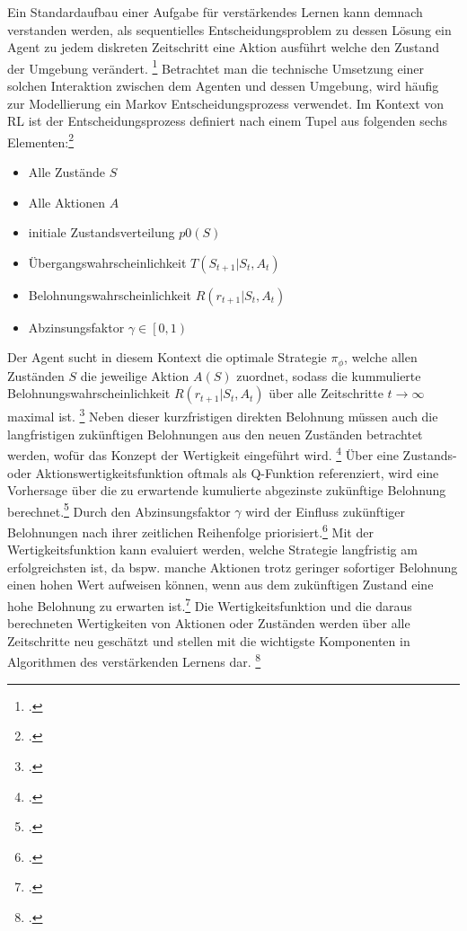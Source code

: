 Ein Standardaufbau einer Aufgabe für verstärkendes Lernen kann demnach verstanden werden, als sequentielles Entscheidungsproblem zu dessen Lösung ein Agent zu jedem diskreten Zeitschritt eine Aktion ausführt welche den Zustand der Umgebung verändert. \footcite[Vgl.][S. 2]{Zhao.2020}
Betrachtet man die technische Umsetzung einer solchen Interaktion zwischen dem Agenten und dessen Umgebung, wird häufig zur Modellierung ein Markov Entscheidungsprozess verwendet.
Im Kontext von RL ist der Entscheidungsprozess definiert nach einem Tupel aus folgenden sechs Elementen:\footcite[Vgl.][S. 2]{Zhang.2018}
\begin{itemize}
    \item Alle Zustände $S$
    \item Alle Aktionen $A$
    \item initiale Zustandsverteilung $p0(S)$
    \item Übergangswahrscheinlichkeit $T(S_{t+1}|S_{t},A_{t})$
    \item Belohnungswahrscheinlichkeit $R(r_{t+1}|S_{t},A_{t})$
    \item Abzinsungsfaktor $\gamma \in \left[0,1\right)$
\end{itemize}
Der Agent sucht in diesem Kontext die optimale Strategie $\pi_{\phi}$, welche allen Zuständen $S$ die jeweilige Aktion $A(S)$ zuordnet, sodass die kummulierte Belohnungswahrscheinlichkeit $R(r_{t+1}|S_{t},A_{t})$ über alle Zeitschritte $t \rightarrow \infty$ maximal ist. \footcite[Vgl.][S. 2]{Reda.2020}
Neben dieser kurzfristigen direkten Belohnung müssen auch die langfristigen zukünftigen Belohnungen aus den neuen Zuständen betrachtet werden, wofür das Konzept der Wertigkeit eingeführt wird. \footcite[Vgl.][S. 3]{Wang.2020}
Über eine Zustands- oder Aktionswertigkeitsfunktion oftmals als Q-Funktion referenziert, wird eine Vorhersage über die zu erwartende kumulierte abgezinste zukünftige Belohnung berechnet.\footcite[Vgl.][S. 5]{Li.2019}
Durch den Abzinsungsfaktor $\gamma$ wird der Einfluss zukünftiger Belohnungen nach ihrer zeitlichen Reihenfolge priorisiert.\footcite[Vgl][S. 5]{Li.2019}
Mit der Wertigkeitsfunktion kann evaluiert werden, welche Strategie langfristig am erfolgreichsten ist, da bspw. manche Aktionen trotz geringer sofortiger Belohnung einen hohen Wert aufweisen können, wenn aus dem zukünftigen Zustand eine hohe Belohnung zu erwarten ist.\footcite[Vgl.][S. 6]{Sutton.2018}
Die Wertigkeitsfunktion und die daraus berechneten Wertigkeiten von Aktionen oder Zuständen werden über alle Zeitschritte neu geschätzt und stellen mit die wichtigste Komponenten in Algorithmen des verstärkenden Lernens dar. \footcite[Vgl.][S. 6f.]{Sutton.2018}
